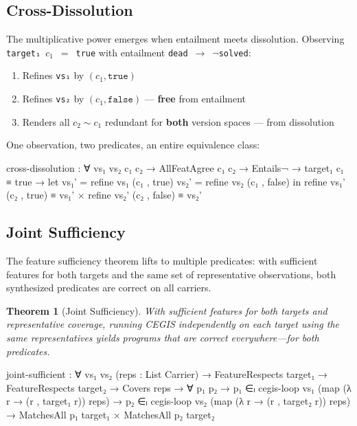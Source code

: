 \documentclass[9pt,a4paper]{article}
\theoremstyle{plain}
\newtheorem{theorem}{Theorem}
\theoremstyle{definition}
\theoremstyle{remark}
\begin{document}
\subsection{Cross-Dissolution}

The multiplicative power emerges when entailment meets dissolution.  Observing \texttt{target₁}~$c_1$~$=$~\texttt{true} with entailment \texttt{dead}~$\to$~$\neg$\texttt{solved}:

\begin{enumerate}
\item Refines \texttt{vs₁} by $(c_1, \texttt{true})$
\item Refines \texttt{vs₂} by $(c_1, \texttt{false})$ --- \textbf{free} from entailment
\item Renders all $c_2 \sim c_1$ redundant for \textbf{both} version spaces --- from dissolution
\end{enumerate}

\noindent One observation, two predicates, an entire equivalence class:

\begin{spec}
      cross-dissolution : ∀ vs₁ vs₂ c₁ c₂ →
        AllFeatAgree c₁ c₂ →
        Entails¬ → target₁ c₁ ≡ true →
        let vs₁' = refine vs₁ (c₁ , true)
            vs₂' = refine vs₂ (c₁ , false)
        in refine vs₁' (c₂ , true)  ≡ vs₁'
         × refine vs₂' (c₂ , false) ≡ vs₂'
\end{spec}

\subsection{Joint Sufficiency}

The feature sufficiency theorem lifts to multiple predicates: with sufficient features for both targets and the same set of representative observations, both synthesized predicates are correct on all carriers.

\begin{theorem}[Joint Sufficiency]
\label{thm:joint-sufficiency}
With sufficient features for both targets and representative coverage, running CEGIS independently on each target using the same representatives yields programs that are correct everywhere---for \emph{both} predicates.
\end{theorem}

\begin{spec}
      joint-sufficient : ∀ vs₁ vs₂ (reps : List Carrier) →
        FeatureRespects target₁ →
        FeatureRespects target₂ →
        Covers reps →
        ∀ p₁ p₂ →
        p₁ ∈ₗ cegis-loop vs₁
                 (map (λ r → (r , target₁ r)) reps) →
        p₂ ∈ₗ cegis-loop vs₂
                 (map (λ r → (r , target₂ r)) reps) →
        MatchesAll p₁ target₁ × MatchesAll p₂ target₂
\end{spec}
\end{document}
